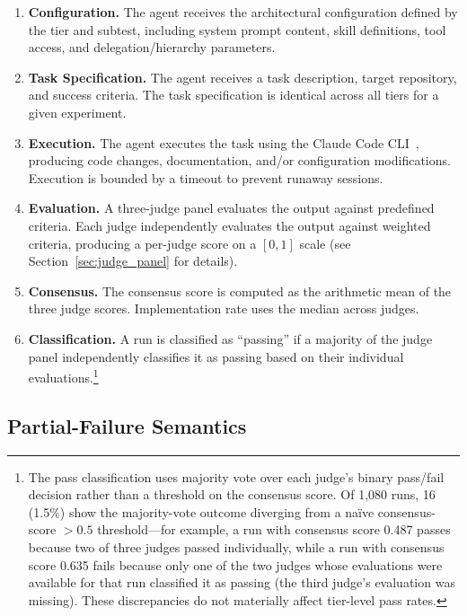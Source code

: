 \documentclass[11pt]{article}
\begin{document}
\begin{enumerate}
  \item \textbf{Configuration.} The agent receives the architectural
    configuration defined by the tier and subtest, including system prompt
    content, skill definitions, tool access, and delegation/hierarchy
    parameters.
  \item \textbf{Task Specification.} The agent receives a task description,
    target repository, and success criteria. The task specification is
    identical across all tiers for a given experiment.
  \item \textbf{Execution.} The agent executes the task using the Claude Code
    CLI~\cite{anthropic2024claude}, producing code changes, documentation,
    and/or configuration modifications. Execution is bounded by a timeout
    to prevent runaway sessions.
  \item \textbf{Evaluation.} A three-judge panel evaluates the output against
    predefined criteria. Each judge independently evaluates the output
    against weighted criteria, producing a per-judge score on a $[0, 1]$
    scale (see Section~\ref{sec:judge_panel} for details).
  \item \textbf{Consensus.} The consensus score is computed as the arithmetic
    mean of the three judge scores. Implementation rate uses the median across
    judges.
  \item \textbf{Classification.} A run is classified as ``passing'' if a
    majority of the judge panel independently classifies it as passing based
    on their individual evaluations.\footnote{The pass classification uses
    majority vote over each judge's binary pass/fail decision rather than a
    threshold on the consensus score. Of 1,080 runs, 16 (1.5\%) show the
    majority-vote outcome diverging from a na\"ive consensus-score $> 0.5$
    threshold---for example, a run with consensus score 0.487 passes because
    two of three judges passed individually, while a run with consensus score
    0.635 fails because only one of the two judges whose evaluations were
    available for that run classified it as passing (the third judge's
    evaluation was missing). These discrepancies do not materially affect
    tier-level pass rates.}
\end{enumerate}

\subsection{Partial-Failure Semantics}
\label{sec:partial_failure}
\end{document}
